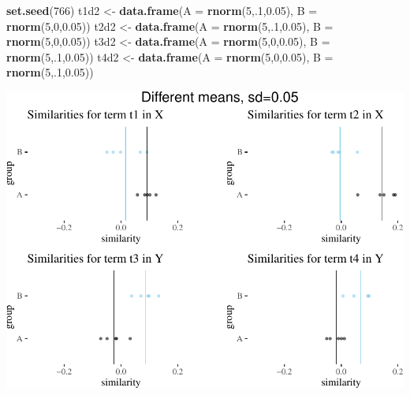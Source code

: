 \documentclass[10pt,dvipsnames,enabledeprecatedfontcommands]{scrartcl}
\newenvironment{Shaded}{\begin{snugshade}}{\end{snugshade}}
\newcommand{\KeywordTok}[1]{\textcolor[rgb]{0.13,0.29,0.53}{\textbf{#1}}}
\newcommand{\DataTypeTok}[1]{\textcolor[rgb]{0.13,0.29,0.53}{#1}}
\newcommand{\DecValTok}[1]{\textcolor[rgb]{0.00,0.00,0.81}{#1}}
\newcommand{\FloatTok}[1]{\textcolor[rgb]{0.00,0.00,0.81}{#1}}
\newcommand{\StringTok}[1]{\textcolor[rgb]{0.31,0.60,0.02}{#1}}
\newcommand{\NormalTok}[1]{#1}
\begin{document}
\vspace{1mm} \footnotesize

\begin{Shaded}
\begin{Highlighting}[]
\KeywordTok{set.seed}\NormalTok{(}\DecValTok{766}\NormalTok{)}
\NormalTok{t1d2 <-}\StringTok{ }\KeywordTok{data.frame}\NormalTok{(}\DataTypeTok{A  =} \KeywordTok{rnorm}\NormalTok{(}\DecValTok{5}\NormalTok{,.}\DecValTok{1}\NormalTok{,}\FloatTok{0.05}\NormalTok{), }\DataTypeTok{B =} \KeywordTok{rnorm}\NormalTok{(}\DecValTok{5}\NormalTok{,}\DecValTok{0}\NormalTok{,}\FloatTok{0.05}\NormalTok{))}
\NormalTok{t2d2 <-}\StringTok{ }\KeywordTok{data.frame}\NormalTok{(}\DataTypeTok{A  =} \KeywordTok{rnorm}\NormalTok{(}\DecValTok{5}\NormalTok{,.}\DecValTok{1}\NormalTok{,}\FloatTok{0.05}\NormalTok{), }\DataTypeTok{B =} \KeywordTok{rnorm}\NormalTok{(}\DecValTok{5}\NormalTok{,}\DecValTok{0}\NormalTok{,}\FloatTok{0.05}\NormalTok{))}
\NormalTok{t3d2 <-}\StringTok{ }\KeywordTok{data.frame}\NormalTok{(}\DataTypeTok{A  =} \KeywordTok{rnorm}\NormalTok{(}\DecValTok{5}\NormalTok{,}\DecValTok{0}\NormalTok{,}\FloatTok{0.05}\NormalTok{), }\DataTypeTok{B =} \KeywordTok{rnorm}\NormalTok{(}\DecValTok{5}\NormalTok{,.}\DecValTok{1}\NormalTok{,}\FloatTok{0.05}\NormalTok{))}
\NormalTok{t4d2 <-}\StringTok{ }\KeywordTok{data.frame}\NormalTok{(}\DataTypeTok{A  =} \KeywordTok{rnorm}\NormalTok{(}\DecValTok{5}\NormalTok{,}\DecValTok{0}\NormalTok{,}\FloatTok{0.05}\NormalTok{), }\DataTypeTok{B =} \KeywordTok{rnorm}\NormalTok{(}\DecValTok{5}\NormalTok{,.}\DecValTok{1}\NormalTok{,}\FloatTok{0.05}\NormalTok{))}
\end{Highlighting}
\end{Shaded}

\normalsize

\vspace{1mm} \footnotesize

\begin{center}\includegraphics[width=1\linewidth]{paperDraft_files/figure-latex/unnamed-chunk-10-1} \end{center}
\end{document}
